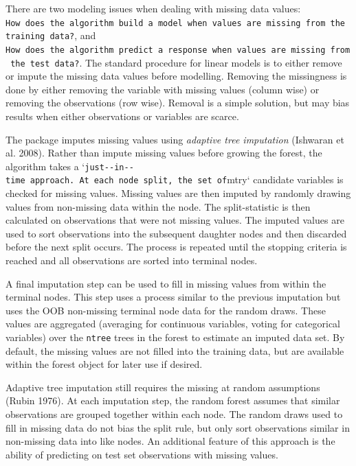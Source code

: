 \documentclass[article, nojss]{jss}
\begin{document}
There are two modeling issues when dealing with missing data values:
\texttt{How\ does\ the\ algorithm\ build\ a\ model\ when\ values\ are\ missing\ from\ the\ training\ data?},
and
\texttt{How\ does\ the\ algorithm\ predict\ a\ response\ when\ values\ are\ missing\ from\ the\ test\ data?}.
The standard procedure for linear models is to either remove or impute
the missing data values before modelling. Removing the missingness is
done by either removing the variable with missing values (column wise)
or removing the observations (row wise). Removal is a simple solution,
but may bias results when either observations or variables are scarce.

The  package imputes missing values using
\emph{adaptive tree imputation} (Ishwaran et al. 2008). Rather than
impute missing values before growing the forest, the algorithm takes a
`\texttt{just-\/-in-\/-time\textquotesingle{}\textquotesingle{}\ approach.\ At\ each\ node\ split,\ the\ set\ of}mtry`
candidate variables is checked for missing values. Missing values are
then imputed by randomly drawing values from non-missing data within the
node. The split-statistic is then calculated on observations that were
not missing values. The imputed values are used to sort observations
into the subsequent daughter nodes and then discarded before the next
split occurs. The process is repeated until the stopping criteria is
reached and all observations are sorted into terminal nodes.

A final imputation step can be used to fill in missing values from
within the terminal nodes. This step uses a process similar to the
previous imputation but uses the OOB non-missing terminal node data for
the random draws. These values are aggregated (averaging for continuous
variables, voting for categorical variables) over the \texttt{ntree}
trees in the forest to estimate an imputed data set. By default, the
missing values are not filled into the training data, but are available
within the forest object for later use if desired.

Adaptive tree imputation still requires the missing at random
assumptions (Rubin 1976). At each imputation step, the random forest
assumes that similar observations are grouped together within each node.
The random draws used to fill in missing data do not bias the split
rule, but only sort observations similar in non-missing data into like
nodes. An additional feature of this approach is the ability of
predicting on test set observations with missing values.
\end{document}
